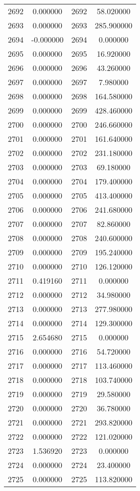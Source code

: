 \documentclass[12pt]{article}
\begin{document}
\begin{longtable}{@{}cccc@{}}
2692 & 0.000000 & 2692 & 58.020000 \\
2693 & 0.000000 & 2693 & 285.900000 \\
2694 & -0.000000 & 2694 & 0.000000 \\
2695 & 0.000000 & 2695 & 16.920000 \\
2696 & 0.000000 & 2696 & 43.260000 \\
2697 & 0.000000 & 2697 & 7.980000 \\
2698 & 0.000000 & 2698 & 164.580000 \\
2699 & 0.000000 & 2699 & 428.460000 \\
2700 & 0.000000 & 2700 & 246.660000 \\
2701 & 0.000000 & 2701 & 161.640000 \\
2702 & 0.000000 & 2702 & 231.180000 \\
2703 & 0.000000 & 2703 & 69.180000 \\
2704 & 0.000000 & 2704 & 179.400000 \\
2705 & 0.000000 & 2705 & 413.400000 \\
2706 & 0.000000 & 2706 & 241.680000 \\
2707 & 0.000000 & 2707 & 82.860000 \\
2708 & 0.000000 & 2708 & 240.600000 \\
2709 & 0.000000 & 2709 & 195.240000 \\
2710 & 0.000000 & 2710 & 126.120000 \\
2711 & 0.419160 & 2711 & 0.000000 \\
2712 & 0.000000 & 2712 & 34.980000 \\
2713 & 0.000000 & 2713 & 277.980000 \\
2714 & 0.000000 & 2714 & 129.300000 \\
2715 & 2.654680 & 2715 & 0.000000 \\
2716 & 0.000000 & 2716 & 54.720000 \\
2717 & 0.000000 & 2717 & 113.460000 \\
2718 & 0.000000 & 2718 & 103.740000 \\
2719 & 0.000000 & 2719 & 29.580000 \\
2720 & 0.000000 & 2720 & 36.780000 \\
2721 & 0.000000 & 2721 & 293.820000 \\
2722 & 0.000000 & 2722 & 121.020000 \\
2723 & 1.536920 & 2723 & 0.000000 \\
2724 & 0.000000 & 2724 & 23.400000 \\
2725 & 0.000000 & 2725 & 113.820000 \\

\end{longtable}
\end{document}
